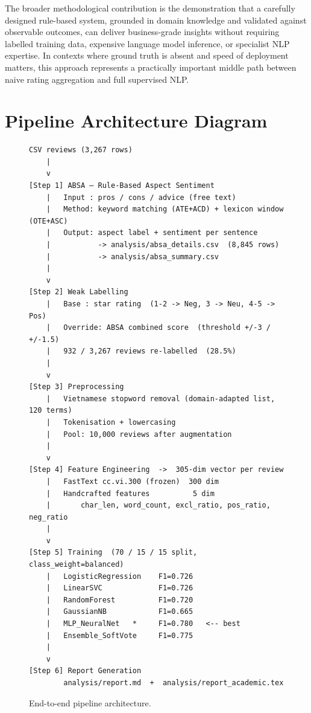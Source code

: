 \documentclass[12pt, a4paper]{article}
\begin{document}
The broader methodological contribution is the demonstration that a carefully designed rule-based system, grounded in domain knowledge and validated against observable outcomes, can deliver business-grade insights without requiring labelled training data, expensive language model inference, or specialist NLP expertise. In contexts where ground truth is absent and speed of deployment matters, this approach represents a practically important middle path between naive rating aggregation and full supervised NLP.

\appendix
\section{Pipeline Architecture Diagram}

\begin{figure}[H]
\centering
\begin{minipage}{0.85\textwidth}
\begin{verbatim}
CSV reviews (3,267 rows)
    |
    v
[Step 1] ABSA — Rule-Based Aspect Sentiment
    |   Input : pros / cons / advice (free text)
    |   Method: keyword matching (ATE+ACD) + lexicon window (OTE+ASC)
    |   Output: aspect label + sentiment per sentence
    |           -> analysis/absa_details.csv  (8,845 rows)
    |           -> analysis/absa_summary.csv
    |
    v
[Step 2] Weak Labelling
    |   Base : star rating  (1-2 -> Neg, 3 -> Neu, 4-5 -> Pos)
    |   Override: ABSA combined score  (threshold +/-3 / +/-1.5)
    |   932 / 3,267 reviews re-labelled  (28.5%)
    |
    v
[Step 3] Preprocessing
    |   Vietnamese stopword removal (domain-adapted list, 120 terms)
    |   Tokenisation + lowercasing
    |   Pool: 10,000 reviews after augmentation
    |
    v
[Step 4] Feature Engineering  ->  305-dim vector per review
    |   FastText cc.vi.300 (frozen)  300 dim
    |   Handcrafted features          5 dim
    |       char_len, word_count, excl_ratio, pos_ratio, neg_ratio
    |
    v
[Step 5] Training  (70 / 15 / 15 split, class_weight=balanced)
    |   LogisticRegression    F1=0.726
    |   LinearSVC             F1=0.726
    |   RandomForest          F1=0.720
    |   GaussianNB            F1=0.665
    |   MLP_NeuralNet   *     F1=0.780   <-- best
    |   Ensemble_SoftVote     F1=0.775
    |
    v
[Step 6] Report Generation
        analysis/report.md  +  analysis/report_academic.tex
\end{verbatim}
\end{minipage}
\caption{End-to-end pipeline architecture.}
\end{figure}
\end{document}
